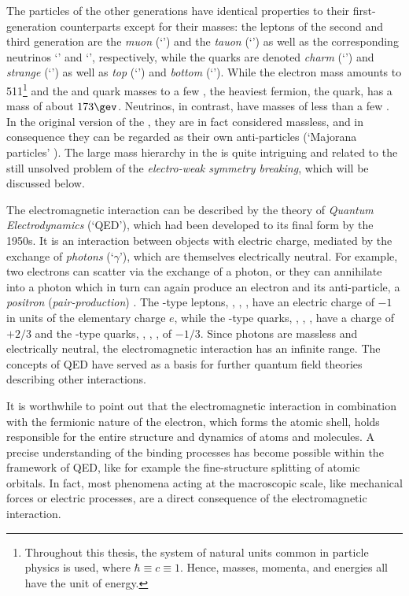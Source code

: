 The particles of the other generations have identical properties to their first-generation counterparts except for their masses:
the leptons of the second and third generation are the \emph{muon} (`\lmu') and the \emph{tauon} (`\ltau') as well as the corresponding neutrinos `\numu' and `\nutau', respectively, while the quarks are denoted \emph{charm} (`\qc') and \emph{strange} (`\qs') as well as \emph{top} (`\qt') and \emph{bottom} (`\qb').
While the electron mass amounts to 511\kev\footnote{Throughout this thesis, the system of natural units common in particle physics is used, where \mbox{$\hbar \equiv c \equiv 1$}. Hence, masses, momenta, and energies all have the unit of energy.} and the \qu and \qd quark masses to a few \mevnospace, the heaviest \sm fermion, the \qt quark, has a mass of about $173\gev$.
Neutrinos, in contrast, have masses of less than a few \evnospace.
In the original version of the \sm, they are in fact considered massless, and in consequence they can be regarded as their own anti-particles (`Majorana particles' \addref).
The large mass hierarchy in the \sm is quite intriguing and related to the still unsolved problem of the \emph{electro-weak symmetry breaking}, which will be discussed below.

The electromagnetic interaction can be described by the theory of \emph{Quantum Electrodynamics} (`QED'), which had been developed to its final form by the 1950s.
It is an interaction between objects with electric charge, mediated by the exchange of \emph{photons} (`$\gamma$'), which are themselves electrically neutral.
For example, two electrons can scatter via the exchange of a photon, or they can annihilate into a photon which in turn can again produce an electron and its anti-particle, a \emph{positron} (\emph{pair-production}) \addfig.
The \lel-type leptons, \ie \lel, \lmu, \ltau, have an electric charge of $-1$ in units of the elementary charge $e$, while the \qu-type quarks, \ie \qu, \qc, \qt, have a charge of $+2/3$ and the \qd-type quarks, \ie \qd, \qs, \qb, of $-1/3$.
Since photons are massless and electrically neutral, the electromagnetic interaction has an infinite range.
The concepts of QED have served as a basis for further quantum field theories describing other interactions.

It is worthwhile to point out that the electromagnetic interaction in combination with the fermionic nature of the electron, which forms the atomic shell, holds responsible for the entire structure and dynamics of atoms and molecules.
A precise understanding of the binding processes has become possible within the framework of QED, like for example the fine-structure splitting of atomic orbitals.
In fact, most phenomena acting at the macroscopic scale, like mechanical forces or electric processes, are a direct consequence of the electromagnetic interaction.

